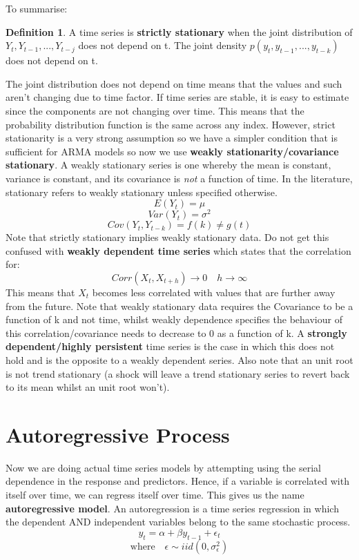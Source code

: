 \documentclass[11pt, oneside]{article}
\theoremstyle{definition}
\newtheorem{definition}{Definition}[section]
\begin{document}
To summarise:
\bigskip
\begin{definition}
  A time series is \textbf{strictly stationary} when the joint distribution of $Y_t,Y_{t-1},...,Y_{t-j}$ does not depend on t. The joint density $p(y_t,y_{t-1},...,y_{t-k})$ does not depend on t.
\end{definition}
The joint distribution does not depend on time means that the values and such aren't changing due to time factor. If time series are stable, it is easy to estimate since the components are not changing over time. This means that the probability distribution function is the same across any index. However, strict stationarity is a very strong assumption so we have a simpler condition that is sufficient for ARMA models so now we use \textbf{weakly stationarity/covariance stationary}. A weakly stationary series is one whereby the mean is constant, variance is constant, and its covariance is \textit{not} a function of time. In the literature, stationary refers to weakly stationary unless specified otherwise.
$$
E(Y_t) = \mu
$$
$$
Var(Y_t) = \sigma^2
$$
$$
Cov(Y_t,Y_{t-k}) = f(k) \neq g(t)
$$
Note that strictly stationary implies weakly stationary data. Do not get this confused with \textbf{weakly dependent time series} which states that the correlation for:
$$
Corr(X_t,X_{t+h}) \rightarrow 0 \quad h \rightarrow \infty
$$
This means that $X_t$ becomes less correlated with values that are further away from the future. Note that weakly stationary data requires the Covariance to be a function of k and not time, whilst weakly dependence specifies the behaviour of this correlation/covariance needs to decrease to 0 as a function of k. A \textbf{strongly dependent/highly persistent} time series is the case in which this does not hold and is the opposite to a weakly dependent series. Also note that an unit root is not trend stationary (a shock will leave a trend stationary series to revert back to its mean whilst an unit root won't).
\newpage

\section{Autoregressive Process}
Now we are doing actual time series models by attempting using the serial dependence in the response and predictors. Hence, if a variable is correlated with itself over time, we can regress itself over time. This gives us the name \textbf{autoregressive model}. An autoregression is a time series regression in which the dependent AND independent variables belong to the same stochastic process.
$$
y_t = \alpha + \beta y_{t-1} + \epsilon_t
$$
$$
\text{where} \quad \epsilon \sim iid(0,\sigma_{\epsilon}^2)
$$
\end{document}

